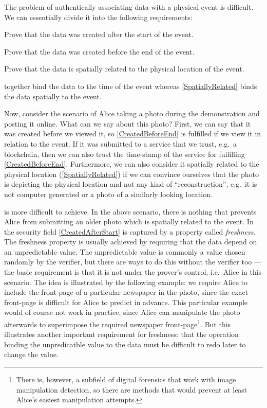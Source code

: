 The problem of authentically associating data with a physical event is 
difficult.
We can essentially divide it into the following requirements:
\begin{requirements}[A]
  \item\label{CreatedAfterStart} Prove that the data was created after the 
    start of the event.
  \item\label{CreatedBeforeEnd} Prove that the data was created before the end 
    of the event.
  \item\label{SpatiallyRelated} Prove that the data is spatially related to the 
    physical location of the event.
\end{requirements}
 together bind the data to the time of 
the event whereas \cref{SpatiallyRelated} binds the data spatially to the 
event.

Now, consider the scenario of Alice taking a photo during the demonstration and 
posting it online.
What can we say about this photo?
First, we can say that it was created before we viewed it, so 
\cref{CreatedBeforeEnd} is fulfilled if we view it in relation to the event.
If it was submitted to a service that we trust, e.g.\ a blockchain, then we can 
also trust the time-stamp of the service for fulfilling 
\cref{CreatedBeforeEnd}.
Furthermore, we can also consider it spatially related to the physical location
(\cref{SpatiallyRelated}) if we can convince ourselves that the photo is 
depicting the physical location and not any kind of \enquote{reconstruction}, 
e.g.\ it is not computer generated or a photo of a similarly looking location.

 is more difficult to achieve.
In the above scenario, there is nothing that prevents Alice from submitting an 
older photo which is spatially related to the event.
In the security field \cref{CreatedAfterStart} is captured by a property called 
\emph{freshness}.
The freshness property is usually achieved by requiring that the data depend on
an unpredictable value.
The unpredictable value is commonly a value chosen randomly by the verifier, 
but there are ways to do this without the verifier too --- the basic 
requirement is that it is not under the prover's control, i.e.\ Alice in this 
scenario.
The idea is illustrated by the following example: we require Alice to include 
the front-page of a particular newspaper in the photo, since the exact 
front-page is difficult for Alice to predict in advance.
This particular example would of course not work in practice, since Alice can 
manipulate the photo afterwards to superimpose the required newspaper 
front-page\footnote{%
  There is, however, a subfield of digital forensics that work with image 
  manipulation detection, so there are methods that would prevent at least 
  Alice's easiest manipulation attempts.
}.
But this illustrates another important requirement for freshness: that the 
operation binding the unpredicatble value to the data must be difficult to redo 
later to change the value.
